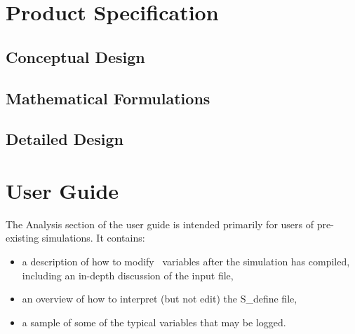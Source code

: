 %
%      
%   
%
%

\chapter{Product Specification}\label{ch:spec}

\section{Conceptual Design}

\section{Mathematical Formulations}

\section{Detailed Design}

\chapter{User Guide}\label{ch:user}
The Analysis section of the user guide is intended primarily for users of pre-existing simulations.  
It contains: 
\begin{itemize}
\item a description of how to modify \ModelNameDesc\ variables after the simulation 
has compiled, including an in-depth discussion of the input file,
\item an overview of how to interpret (but not edit) the S\_define file,
\item a sample of some of the typical variables that may be logged.
\end{itemize}

